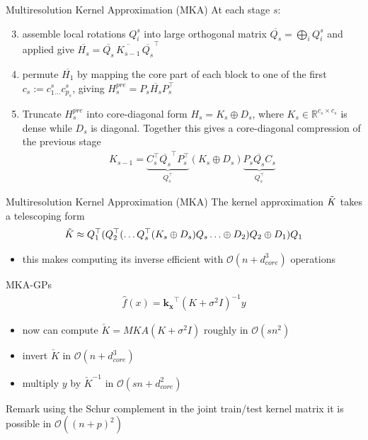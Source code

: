 \documentclass{beamer}
\begin{document}
\begin{frame}{Multiresolution Kernel Approximation (MKA)}
At each stage $s$:
    \begin{enumerate} \setcounter{enumi}{2}
        \item assemble local rotations $Q_i^s$ into large orthogonal matrix $\overline{Q_s}=\bigoplus_i Q_i^s$ and applied give $\overline{H_s}=\overline{Q_s}\,\overline{K_{s-1}}\,\overline{Q_s}^\top$\pause
        \item permute $\overline{H_1}$ by mapping the core part of each block to one of the first $c_s:=c_1^s_\hdots c_{p_s}^s$, giving $H_s^{pre}=P_s\overline{H_s}P_s^\top$\pause
        \item Truncate $H_s^{pre}$ into core-diagonal form $H_s=K_s\oplus D_s$, where $K_s\in\mathbb{R}^{c_s\times c_s}$ is dense while $D_s$ is diagonal. Together this gives a core-diagonal compression of the previous stage
        \begin{align*}
          K_{s-1} = \underbrace{C_s^\top \overline{Q_s}^\top P_s^\top}_{Q_s^\top} (K_s \oplus D_s)\underbrace{P_s \overline{Q_s} C_s}_{Q_s^\top}
        \end{align*}
    \end{enumerate}
\end{frame}

\begin{frame}{Multiresolution Kernel Approximation (MKA)}
    The kernel approximation $\Tilde{K}$ takes a telescoping form
\begin{align*}
\Tilde{K} \approx Q_1^\top(Q_2^\top(\hdots Q_s^\top(K_s\oplus D_s)Q_s\hdots\oplus D_2)Q_2\oplus D_1)Q_1
\end{align*}
\begin{itemize}
    \item this makes computing its inverse efficient with $\mathcal{O}(n+d_{core}^3)$ operations
\end{itemize}
\end{frame}

\begin{frame}{MKA-GPs}
\begin{align*}
    \hat{f}(x)=\mathbf{k_x}^\top(K+\sigma^2I)^{-1}y
\end{align*}
\begin{itemize}
    \item now can compute $\check K=\mathit{MKA}(K+\sigma^2I)$ roughly in $\mathcal{O}(sn^2)$
    \item invert $\check K$ in $\mathcal{O}(n+d_{core}^3)$
    \item multiply $y$ by $\check{K}^{-1}$ in $\mathcal{O}(sn+d_{core}^2)$
\end{itemize}
\pause
\begin{block}{Remark}
using the Schur complement in the joint train/test kernel matrix it is possible in $\mathcal{O}((n+p)^2)$
\end{block}
\end{frame}
\end{document}
